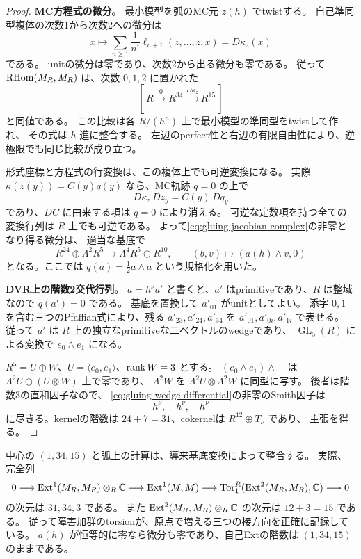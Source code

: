 \begin{proof}
\textbf{MC方程式の微分。}
最小模型を弧のMC元 $z(h)$ でtwistする。
自己準同型複体の次数1から次数2への微分は
\[
 x\longmapsto\sum_{n\ge1}\frac1{n!}\ell_{n+1}(z,\ldots,z,x)
       =D\kappa_z(x)
\]
である\cite[Proposition 4.4]{Getzler}。
unitの微分は零であり、次数2から出る微分も零である。
従って $\operatorname{RHom}(M_R,M_R)$ は、次数 $0,1,2$ に置かれた
\begin{equation}\label{eq:gluing-jacobian-complex}
 [\,R\xrightarrow{0}R^{34}\xrightarrow{D\kappa_z}R^{15}\,]
\end{equation}
と同値である。
この比較は各 $R/(h^n)$ 上で最小模型の準同型をtwistして作れ、
その式は $h$-進に整合する。
左辺のperfect性と右辺の有限自由性により、逆極限でも同じ比較が成り立つ。

形式座標と方程式の行変換は、この複体上でも可逆変換になる。
実際 $\kappa(z(y))=C(y)q(y)$ なら、MC軌跡 $q=0$ の上で
\[
 D\kappa_z\,Dz_y=C(y)\,Dq_y
\]
であり、$DC$ に由来する項は $q=0$ により消える。
可逆な定数項を持つ全ての変換行列は $R$ 上でも可逆である。
よって\eqref{eq:gluing-jacobian-complex}の非零となり得る微分は、
適当な基底で
\begin{equation}\label{eq:gluing-wedge-differential}
 R^{24}\oplus\Lambda^2R^5
 \longrightarrow\Lambda^4R^5\oplus R^{10},\qquad
 (b,v)\longmapsto(a(h)\wedge v,0)
\end{equation}
となる。ここでは $q(a)=\tfrac12a\wedge a$ という規格化を用いた。

\textbf{DVR上の階数2交代行列。}
$a=h^{\nu} a'$ と書くと、$a'$ はprimitiveであり、$R$ は整域なので $q(a')=0$ である。
基底を置換して $a'_{01}$ がunitとしてよい。
添字 $0,1$ を含む三つのPfaffian式により、残る
$a'_{23},a'_{24},a'_{34}$ を $a'_{01},a'_{0i},a'_{1i}$ で表せる。
従って $a'$ は $R$ 上の独立なprimitiveな二ベクトルのwedgeであり、
$\operatorname{GL}_5(R)$ による変換で $e_0\wedge e_1$ になる。

$R^5=U\oplus W$、$U=\langle e_0,e_1\rangle$、$\operatorname{rank} W=3$ とする。
$(e_0\wedge e_1)\wedge-$ は
$\Lambda^2U\oplus(U\otimes W)$ 上で零であり、
$\Lambda^2W$ を $\Lambda^2U\otimes\Lambda^2W$ に同型に写す。
後者は階数3の直和因子なので、
\eqref{eq:gluing-wedge-differential}の非零のSmith因子は
\[
                         h^{\nu},\quad h^{\nu},\quad h^{\nu}
\]
に尽きる。kernelの階数は $24+7=31$、cokernelは $R^{12}\oplus T_\nu$ であり、
主張を得る。
\end{proof}

\begin{remark}[特殊ファイバーで戻る三つの接方向]
中心の $(1,34,15)$ と弧上の計算は、導来基底変換によって整合する。
実際、完全列
\[
 0\longrightarrow\operatorname{Ext}^1(M_R,M_R)\otimes_R\mathbb C
 \longrightarrow\operatorname{Ext}^1(M,M)
 \longrightarrow\operatorname{Tor}_1^R(\operatorname{Ext}^2(M_R,M_R),\mathbb C)
 \longrightarrow0
\]
の次元は $31,34,3$ である。
また $\operatorname{Ext}^2(M_R,M_R)\otimes_R\mathbb C$ の次元は $12+3=15$ である。
従って障害加群のtorsionが、原点で増える三つの接方向を正確に記録している。
$a(h)$ が恒等的に零なら微分も零であり、自己Extの階数は $(1,34,15)$ のままである。
\end{remark}

